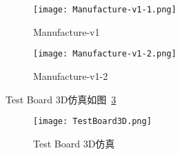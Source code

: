 \begin{figure}[htbp]
    \centering
    \texttt{[image: Manufacture-v1-1.png]}
    \caption{Manufacture-v1}
    \label{fig:Manufacture-v1-1}
\end{figure}

\begin{figure}[htbp]
    \centering
    \texttt{[image: Manufacture-v1-2.png]}
    \caption{Manufacture-v1-2}
    \label{fig:Manufacture-v1-2}
\end{figure}

Test Board 3D仿真如图~\ref{fig:TestBoard3D}

\begin{figure}[htbp]
    \centering
    \texttt{[image: TestBoard3D.png]}
    \caption{Test Board 3D仿真}
    \label{fig:TestBoard3D}
\end{figure}